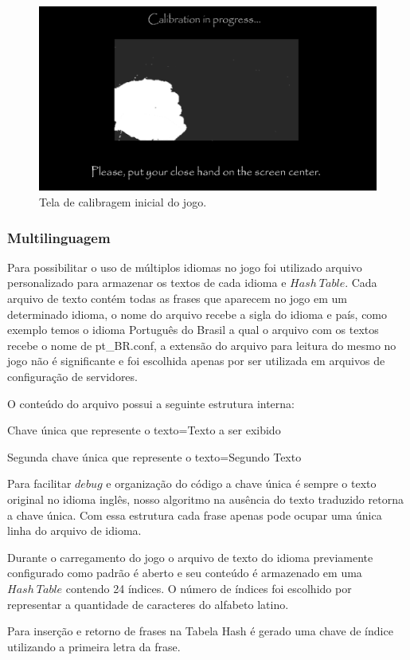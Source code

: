 \documentclass[12pt]{article}
\begin{document}
\begin{figure}[H]
\centering
\includegraphics[width=.60\textwidth]{calibrate.png}
\caption{Tela de calibragem inicial do jogo.} \label{fig1}
\end{figure}


\subsubsection{Multilinguagem}

Para possibilitar o uso de múltiplos idiomas no jogo foi utilizado arquivo personalizado para armazenar os textos de cada idioma e $Hash\ Table$. Cada arquivo de texto contém todas as frases que aparecem no jogo em um determinado idioma, o nome do arquivo recebe a sigla do idioma e país, como exemplo temos o idioma Português do Brasil a qual o arquivo com os textos recebe o nome de pt\_BR.conf, a extensão do arquivo para leitura do mesmo no jogo não é significante e foi escolhida apenas por ser utilizada em arquivos de configuração de servidores.

O conteúdo do arquivo possui a seguinte estrutura interna:\\


\centerline{Chave única que represente o texto=Texto a ser exibido}
\centerline{Segunda chave única que represente o texto=Segundo Texto}


Para facilitar $debug$ e organização do código a chave única é sempre o texto original no idioma inglês, nosso algoritmo na ausência do texto traduzido retorna a chave única. Com essa estrutura cada frase apenas pode ocupar uma única linha do arquivo de idioma.

Durante o carregamento do jogo o arquivo de texto do idioma previamente configurado como padrão é aberto e seu conteúdo é armazenado em uma $Hash\ Table$ contendo 24 índices. O número de índices foi escolhido por representar a quantidade de caracteres do alfabeto latino.

Para inserção e retorno de frases na Tabela Hash é gerado uma chave de índice utilizando a primeira letra da frase.
\end{document}
